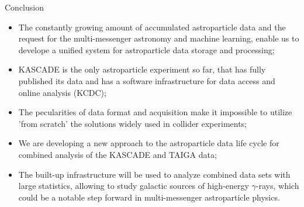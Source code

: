 \begin{frame}{Conclusion}
\small
\begin{itemize}
  \item The constantly growing amount of accumulated astroparticle data and the request for the multi-messenger astronomy and machine learning, enable us to develope a unified system for astroparticle data storage and processing;
  \item KASCADE is the only astroparticle experiment so far, that has fully published its data and has a software infrastructure for data access and online analysis (KCDC);
  \item The pecularities of data format and acquisition make it impossible to utilize 'from scratch' the solutions widely used in collider experiments;
  \item We are developing a new approach to the astroparticle data life cycle for combined analysis of the KASCADE and TAIGA data;
  \item The built-up infrastructure will be used to analyze combined data sets with large statistics, allowing to study galactic sources of high-energy $\gamma$-rays, 
  which could be a notable step forward in multi-messenger astroparticle physics.

\end{itemize}
\end{frame}

%
